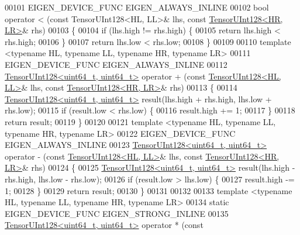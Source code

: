 \begin{DoxyCode}
00101 EIGEN\_DEVICE\_FUNC EIGEN\_ALWAYS\_INLINE
00102 \textcolor{keywordtype}{bool} operator < (const TensorUInt128<HL, LL>& lhs, \textcolor{keyword}{const} \hyperlink{struct_eigen_1_1internal_1_1_tensor_u_int128}{TensorUInt128<HR, LR>}& rhs)
00103 \{
00104   \textcolor{keywordflow}{if} (lhs.high != rhs.high) \{
00105     \textcolor{keywordflow}{return} lhs.high < rhs.high;
00106   \}
00107   \textcolor{keywordflow}{return} lhs.low < rhs.low;
00108 \}
00109 
00110 \textcolor{keyword}{template} <\textcolor{keyword}{typename} HL, \textcolor{keyword}{typename} LL, \textcolor{keyword}{typename} HR, \textcolor{keyword}{typename} LR>
00111 EIGEN\_DEVICE\_FUNC EIGEN\_ALWAYS\_INLINE
00112 \hyperlink{struct_eigen_1_1internal_1_1_tensor_u_int128}{TensorUInt128<uint64\_t, uint64\_t>} operator + (\textcolor{keyword}{const} 
      \hyperlink{struct_eigen_1_1internal_1_1_tensor_u_int128}{TensorUInt128<HL, LL>}& lhs, \textcolor{keyword}{const} \hyperlink{struct_eigen_1_1internal_1_1_tensor_u_int128}{TensorUInt128<HR, LR>}& rhs)
00113 \{
00114   \hyperlink{struct_eigen_1_1internal_1_1_tensor_u_int128}{TensorUInt128<uint64\_t, uint64\_t>} result(lhs.high + rhs.high, lhs.low + 
      rhs.low);
00115   \textcolor{keywordflow}{if} (result.low < rhs.low) \{
00116     result.high += 1;
00117   \}
00118   \textcolor{keywordflow}{return} result;
00119 \}
00120 
00121 \textcolor{keyword}{template} <\textcolor{keyword}{typename} HL, \textcolor{keyword}{typename} LL, \textcolor{keyword}{typename} HR, \textcolor{keyword}{typename} LR>
00122 EIGEN\_DEVICE\_FUNC EIGEN\_ALWAYS\_INLINE
00123 \hyperlink{struct_eigen_1_1internal_1_1_tensor_u_int128}{TensorUInt128<uint64\_t, uint64\_t>} operator - (\textcolor{keyword}{const} 
      \hyperlink{struct_eigen_1_1internal_1_1_tensor_u_int128}{TensorUInt128<HL, LL>}& lhs, \textcolor{keyword}{const} \hyperlink{struct_eigen_1_1internal_1_1_tensor_u_int128}{TensorUInt128<HR, LR>}& rhs)
00124 \{
00125   \hyperlink{struct_eigen_1_1internal_1_1_tensor_u_int128}{TensorUInt128<uint64\_t, uint64\_t>} result(lhs.high - rhs.high, lhs.low - 
      rhs.low);
00126   \textcolor{keywordflow}{if} (result.low > lhs.low) \{
00127     result.high -= 1;
00128   \}
00129   \textcolor{keywordflow}{return} result;
00130 \}
00131 
00132 
00133 \textcolor{keyword}{template} <\textcolor{keyword}{typename} HL, \textcolor{keyword}{typename} LL, \textcolor{keyword}{typename} HR, \textcolor{keyword}{typename} LR>
00134 \textcolor{keyword}{static} EIGEN\_DEVICE\_FUNC EIGEN\_STRONG\_INLINE
00135 \hyperlink{struct_eigen_1_1internal_1_1_tensor_u_int128}{TensorUInt128<uint64\_t, uint64\_t>} operator * (\textcolor{keyword}{const} 

\end{DoxyCode}
